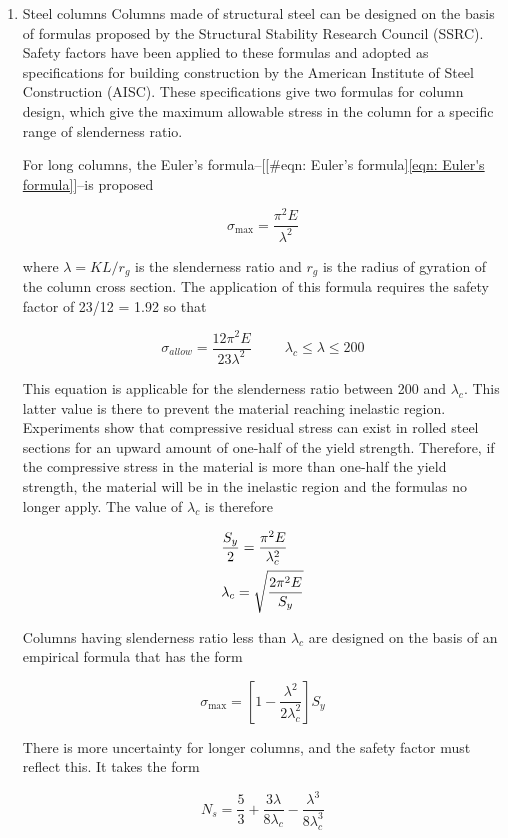 \documentclass[a4paper,openany,12pt]{book}
\begin{document}
{{\begin{enumerate}
\item Steel columns
\label{steel-columns}
Columns made of structural steel can be designed on the basis of
formulas proposed by the Structural Stability Research Council (SSRC).
Safety factors have been applied to these formulas and adopted as
specifications for building construction by the American Institute of
Steel Construction (AISC). These specifications give two formulas for
column design, which give the maximum allowable stress in the column for
a specific range of slenderness ratio.

For long columns, the Euler's
formula--[[\#eqn: Euler's formula]\ref{eqn: Euler's formula}]--is proposed

$$\sigma_{\max} = \frac{\pi^2E}{\lambda^2}$$

where \(\lambda = KL/r_g\) is the slenderness ratio and \(r_g\) is the
radius of gyration of the column cross section. The application of this
formula requires the safety factor of 23/12 = 1.92 so that

$$\sigma_{allow} = \frac{12\pi^2E}{23\lambda^2} \hspace{1cm} \lambda_c \leqslant \lambda \leqslant 200$$

This equation is applicable for the slenderness ratio between 200 and
\(\lambda_c\). This latter value is there to prevent the material reaching
inelastic region. Experiments show that compressive residual stress can
exist in rolled steel sections for an upward amount of one-half of the
yield strength. Therefore, if the compressive stress in the material is
more than one-half the yield strength, the material will be in the
inelastic region and the formulas no longer apply. The value of
\(\lambda_c\) is therefore

$$\begin{gathered}
  \frac{S_y}{2} = \frac{\pi ^2E}{\lambda_c^2} \hfill \\
  \lambda_c = \sqrt {\frac{2\pi^2E}{S_y}}  \hfill \end{gathered}$$

Columns having slenderness ratio less than \(\lambda_c\) are designed on
the basis of an empirical formula that has the form

$$\sigma _{\max} = \left[ 1 - \frac{\lambda^2}{2\lambda_c^2} \right]S_y$$

There is more uncertainty for longer columns, and the safety factor must
reflect this. It takes the form

$$N_s = \frac{5}{3} + \frac{3\lambda}{8\lambda_c} - \frac{\lambda^3}{8\lambda_c^3}$$


\end{enumerate}}}
\end{document}

